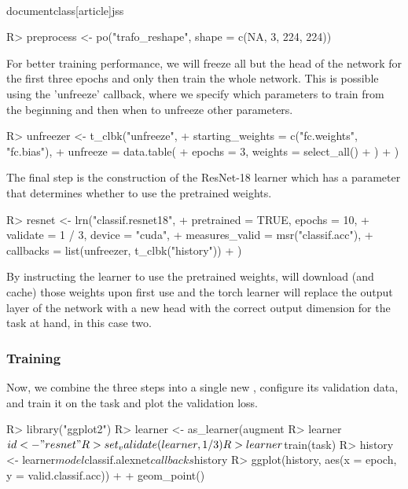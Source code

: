 \\documentclass[article]{jss}
\theoremstyle{definition}
\begin{document}
\begin{CodeInput}
R> preprocess <- po("trafo_reshape", shape = c(NA, 3, 224, 224))
\end{CodeInput}

For better training performance, we will freeze all but the head of the network for the first three epochs and only then train the whole network.
This is possible using the 'unfreeze' callback, where we specify which parameters to train from the beginning and then when to unfreeze other parameters.

\begin{CodeInput}
R> unfreezer <- t_clbk("unfreeze",
+    starting_weights = c("fc.weights", "fc.bias"),
+    unfreeze = data.table(
+      epochs = 3, weights = select_all()
+    )
+ )
\end{CodeInput}

The final step is the construction of the ResNet-18 learner which has a parameter  that determines whether to use the pretrained weights.

\begin{CodeInput}
R> resnet <- lrn("classif.resnet18",
+    pretrained = TRUE, epochs = 10,
+    validate = 1 / 3, device = "cuda",
+    measures_valid = msr("classif.acc"),
+    callbacks = list(unfreezer, t_clbk("history"))
+  )
\end{CodeInput}

By instructing the learner to use the pretrained weights,  will download (and cache) those weights upon first use and the torch learner will replace the output layer of the network with a new head with the correct output dimension for the task at hand, in this case two.

\subsubsection{Training}

Now, we combine the three steps into a single new , configure its validation data, and train it on the task and plot the validation loss.

\begin{CodeInput}
R> library("ggplot2")
R> learner <- as_learner(augment %
R> learner$id <- "resnet"
R> set_validate(learner, 1 / 3)
R> learner$train(task)
R> history <- learner$model$classif.alexnet$callbacks$history
R> ggplot(history, aes(x = epoch, y = valid.classif.acc)) +
+    geom_point()
\end{CodeInput}
\end{document}
